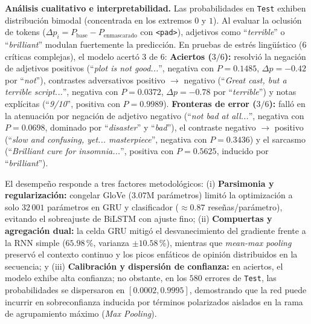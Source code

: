 \documentclass[letterpaper, 10 pt, conference]{ieeeconf}
\makeatletter
\def\section{\@startsection{section}{1}{\z@}{0.75ex plus 0.2ex minus 0.1ex}{0.20ex plus 0.10ex minus 0ex}{\normalfont\normalsize\centering\scshape}}
\makeatother
\begin{document}
\textbf{Análisis cualitativo e interpretabilidad.}
Las probabilidades en \texttt{Test} exhiben distribución bimodal (concentrada en los extremos $0$ y $1$). Al evaluar la oclusión de tokens ($\Delta p_i = P_{\text{base}} - P_{\text{enmascarado}}$ con \texttt{<pad>}), adjetivos como ``\textit{terrible}'' o ``\textit{brilliant}'' modulan fuertemente la predicción. En pruebas de estrés lingüístico ($6$ críticas complejas), el modelo acertó $3$ de $6$:
\textbf{Aciertos ($3/6$):} resolvió la negación de adjetivos positivos (``\textit{plot is not good...}'', negativa con $P=0.1485$, $\Delta p = -0.42$ por ``\textit{not}''), contrastes adversativos positivo $\to$ negativo (``\textit{Great cast, but a terrible script...}'', negativa con $P=0.0372$, $\Delta p = -0.78$ por ``\textit{terrible}'') y notas explícitas (``\textit{9/10}'', positiva con $P=0.9989$).
\textbf{Fronteras de error ($3/6$):} falló en la atenuación por negación de adjetivo negativo (``\textit{not bad at all...}'', negativa con $P=0.0698$, dominado por ``\textit{disaster}'' y ``\textit{bad}''), el contraste negativo $\to$ positivo (``\textit{slow and confusing, yet... masterpiece}'', negativa con $P=0.3436$) y el sarcasmo (``\textit{Brilliant cure for insomnia...}'', positiva con $P=0.5625$, inducido por ``\textit{brilliant}'').

\section{Discusión}

El desempeño responde a tres factores metodológicos:
(i) \textbf{Parsimonia y regularización:} congelar GloVe ($3.07\text{M}$ parámetros) limitó la optimización a solo $32\,001$ parámetros en GRU y clasificador ($\approx 0.87$ reseñas/parámetro), evitando el sobreajuste de BiLSTM con ajuste fino;
(ii) \textbf{Compuertas y agregación dual:} la celda GRU mitigó el desvanecimiento del gradiente frente a la RNN simple ($65.98\,\%$, varianza $\pm 10.58\,\%$), mientras que \textit{mean-max pooling} \cite{c5} preservó el contexto continuo y los picos enfáticos de opinión distribuidos en la secuencia; y
(iii) \textbf{Calibración y dispersión de confianza:} en aciertos, el modelo exhibe alta confianza; no obstante, en los $580$ errores de \texttt{Test}, las probabilidades se dispersaron en $[0.0002, 0.9995]$, demostrando que la red puede incurrir en sobreconfianza inducida por términos polarizados aislados en la rama de agrupamiento máximo (\textit{Max Pooling}).
\end{document}
